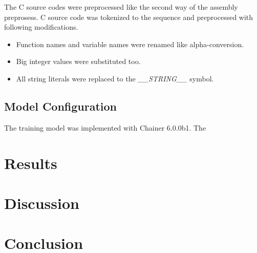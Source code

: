 \documentclass[senior,final,11pt]{iscs-thesis}
\begin{document}
The C source codes were preprocessed like the second way of the assembly preprosess.
C source code was tokenized to the sequence and preprocessed with following modifications.
\begin{itemize}
\item Function names and variable names were renamed like alpha-conversion.
\item Big integer values were substituted too. 
\item All string literals were replaced to the {\sl \_\_STRING\_\_} symbol.
\end{itemize}




\section{Model Configuration}
The training model was implemented with Chainer 6.0.0b1.
The 


\chapter{Results}
\chapter{Discussion}
\chapter{Conclusion}



\end{document}
